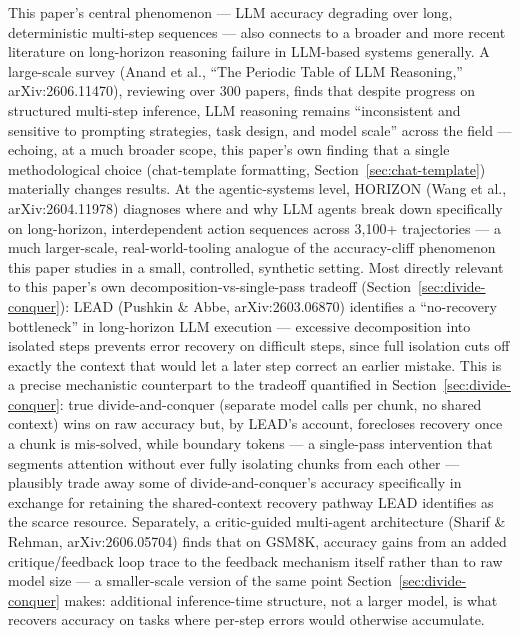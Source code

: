 \documentclass[11pt]{article}
\begin{document}
This paper's central phenomenon --- LLM accuracy degrading over long, deterministic multi-step sequences --- also connects to a broader and more recent literature on long-horizon reasoning failure in LLM-based systems generally. A large-scale survey (Anand et al., ``The Periodic Table of LLM Reasoning,'' arXiv:2606.11470), reviewing over 300 papers, finds that despite progress on structured multi-step inference, LLM reasoning remains ``inconsistent and sensitive to prompting strategies, task design, and model scale'' across the field --- echoing, at a much broader scope, this paper's own finding that a single methodological choice (chat-template formatting, Section~\ref{sec:chat-template}) materially changes results. At the agentic-systems level, HORIZON (Wang et al., arXiv:2604.11978) diagnoses where and why LLM agents break down specifically on long-horizon, interdependent action sequences across 3,100+ trajectories --- a much larger-scale, real-world-tooling analogue of the accuracy-cliff phenomenon this paper studies in a small, controlled, synthetic setting. Most directly relevant to this paper's own decomposition-vs-single-pass tradeoff (Section~\ref{sec:divide-conquer}): LEAD (Pushkin \& Abbe, arXiv:2603.06870) identifies a ``no-recovery bottleneck'' in long-horizon LLM execution --- excessive decomposition into isolated steps prevents error recovery on difficult steps, since full isolation cuts off exactly the context that would let a later step correct an earlier mistake. This is a precise mechanistic counterpart to the tradeoff quantified in Section~\ref{sec:divide-conquer}: true divide-and-conquer (separate model calls per chunk, no shared context) wins on raw accuracy but, by LEAD's account, forecloses recovery once a chunk is mis-solved, while boundary tokens --- a single-pass intervention that segments attention without ever fully isolating chunks from each other --- plausibly trade away some of divide-and-conquer's accuracy specifically in exchange for retaining the shared-context recovery pathway LEAD identifies as the scarce resource. Separately, a critic-guided multi-agent architecture (Sharif \& Rehman, arXiv:2606.05704) finds that on GSM8K, accuracy gains from an added critique/feedback loop trace to the feedback mechanism itself rather than to raw model size --- a smaller-scale version of the same point Section~\ref{sec:divide-conquer} makes: additional inference-time structure, not a larger model, is what recovers accuracy on tasks where per-step errors would otherwise accumulate.
\end{document}
